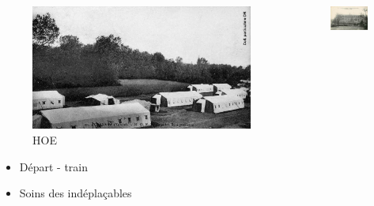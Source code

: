 \documentclass{beamer}
\renewcommand{\tiny}{\fontsize{6pt}{7pt}\selectfont}
\begin{document}
{\begin{frame}
\begin{columns}
					\begin{column}[t]{0.25\linewidth}
						\begin{figure}
							\includegraphics[width=0.8\linewidth, height=0.8\linewidth]{pics/III1c}
							
							\caption{\tiny HOE}
						\end{figure}
						\begin{itemize}
							\item \tiny Départ - train
							\item \tiny Soins des indéplaçables
						\end{itemize}
					\end{column}
				
					\begin{column}[t]{0.25\linewidth}
						\begin{figure}
							\includegraphics[width=0.8\linewidth, height=0.8\linewidth]{pics/III1d}
							

\end{figure}
\end{column}
\end{columns}
\end{frame}}
\end{document}
